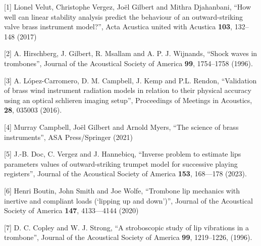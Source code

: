 






  \sectionreferences{}[1] Lionel Velut, Christophe Vergez, Joël Gilbert and 
  Mithra Djahanbani, “How well can linear stability analysis predict the 
  behaviour of an outward-striking valve brass instrument model?”, Acta 
  Acustica united with Acustica \textbf{103}, 132–148 (2017) 

  [2] A. Hirschberg, J. Gilbert, R. Msallam and A. P. J. Wijnands, “Shock waves 
  in trombones”, Journal of the Acoustical Society of America \textbf{99}, 
  1754–1758 (1996). 

  [3] A. López-Carromero, D. M. Campbell, J. Kemp and P.L. Rendon, “Validation 
  of brass wind instrument radiation models in relation to their physical 
  accuracy using an optical schlieren imaging setup”, Proceedings of Meetings 
  in Acoustics, \textbf{28}, 035003 (2016). 

  [4] Murray Campbell, Joël Gilbert and Arnold Myers, “The science of brass 
  instruments”, ASA Press/Springer (2021) 

  [5] J.-B. Doc, C. Vergez and J. Hannebicq, “Inverse problem to estimate lips 
  parameters values of outward-striking trumpet model for successive playing 
  registers”, Journal of the Acoustical Society of America \textbf{153}, 
  168—178 (2023). 

  [6] Henri Boutin, John Smith and Joe Wolfe, “Trombone lip mechanics with 
  inertive and compliant loads (‘lipping up and down’)”, Journal of the 
  Acoustical Society of America \textbf{147}, 4133—4144 (2020) 

  [7] D. C. Copley and W. J. Strong, “A stroboscopic study of lip vibrations in 
  a trombone”, Journal of the Acoustical Society of America \textbf{99}, 
  1219–1226, (1996). 